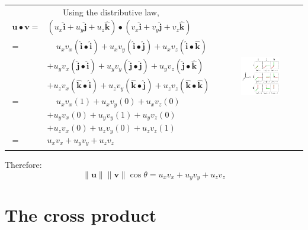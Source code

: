 \documentclass{article}
\begin{document}
\begin{center}
\begin{tabular}{cc}
\parbox{0.5\textwidth}{
Using the distributive law, 
\begin{align*}
\mathbf{u} \bullet \mathbf{v} = & (u_x \hat{\mathbf{i}} + u_y \hat{\mathbf{j}} + u_z \hat{\mathbf{k}}) \bullet (v_x \hat{\mathbf{i}} + v_y \hat{\mathbf{j}} + v_z \hat{\mathbf{k}}) \\ 
= & \;\;\;\; u_x v_x (\hat{\mathbf{i}} \bullet \hat{\mathbf{i}}) + u_x v_y (\hat{\mathbf{i}} \bullet \hat{\mathbf{j}}) + u_x v_z (\hat{\mathbf{i}} \bullet \hat{\mathbf{k}}) \\
& + u_y v_x (\hat{\mathbf{j}} \bullet \hat{\mathbf{i}}) + u_y v_y (\hat{\mathbf{j}} \bullet \hat{\mathbf{j}}) + u_y v_z (\hat{\mathbf{j}} \bullet \hat{\mathbf{k}}) \\ 
& + u_z v_x (\hat{\mathbf{k}} \bullet \hat{\mathbf{i}}) + u_z v_y (\hat{\mathbf{k}} \bullet \hat{\mathbf{j}}) + u_z v_z (\hat{\mathbf{k}} \bullet \hat{\mathbf{k}}) \\ 
= & \;\;\;\; u_x v_x (1) + u_x v_y (0) + u_x v_z (0) \\
& + u_y v_x (0) + u_y v_y (1) + u_y v_z (0) \\ 
& + u_z v_x (0) + u_z v_y (0) + u_z v_z (1) \\ 
= & u_x v_x + u_y v_y + u_z v_z
\end{align*}} & \parbox{0.5\textwidth}{
\includegraphics[width = 0.5\textwidth]{elementary_vector_dot_products}
}
\end{tabular}
Therefore:
\[\|\mathbf{u}\|\|\mathbf{v}\|\cos\theta = u_x v_x + u_y v_y + u_z v_z\]
\end{center}





\section*{The cross product}
\end{document}
